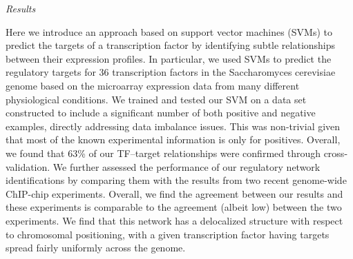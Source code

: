 {\it Results}

 Here we introduce an approach based on support vector machines (SVMs) to predict the targets of a transcription factor by identifying subtle relationships between their expression profiles. In particular, we used SVMs to predict the regulatory targets for 36 transcription factors in the Saccharomyces cerevisiae genome based on the microarray expression data from many different physiological conditions. We trained and tested our SVM on a data set constructed to include a significant number of both positive and negative examples, directly addressing data imbalance issues. This was non-trivial given that most of the known experimental information is only for positives. Overall, we found that 63\% of our TF–target relationships were confirmed through cross-validation. We further assessed the performance of our regulatory network identifications by comparing them with the results from two recent genome-wide ChIP-chip experiments. Overall, we find the agreement between our results and these experiments is comparable to the agreement (albeit low) between the two experiments. We find that this network has a delocalized structure with respect to chromosomal positioning, with a given transcription factor having targets spread fairly uniformly across the genome. 